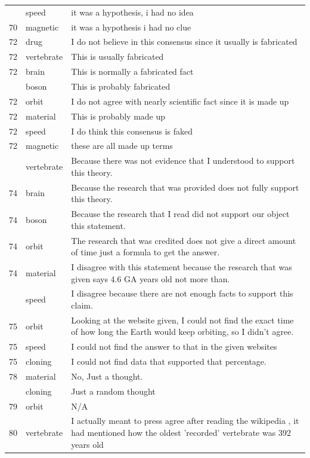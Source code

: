 \documentclass[
  doc,floatsintext]{apa6}
\begin{document}
\begin{longtable}[t]{>{}r>{}l>{\raggedright\arraybackslash}p{30em}}
\addlinespace
70 & speed & it was a hypothesis, i had no idea\\
70 & magnetic & it was a hypothesis i had no clue\\
72 & drug & I do not believe in this consensus since it usually is fabricated\\
72 & vertebrate & This is usually fabricated\\
72 & brain & This is normally a fabricated fact\\
\addlinespace
72 & boson & This is probably fabricated\\
72 & orbit & I do not agree with nearly scientific fact since it is made up\\
72 & material & This is probably made up\\
72 & speed & I do think this consensus is faked\\
72 & magnetic & these are all made up terms\\
\addlinespace
74 & vertebrate & Because there was not evidence that I understood to support this theory.\\
74 & brain & Because the research that was provided does not fully support this theory.\\
74 & boson & Because the research that I read did not support our object this statement.\\
74 & orbit & The research that was credited does not give a direct amount of time just a formula to get the answer.\\
74 & material & I disagree with this statement because the research that was given says 4.6 GA years old not more than.\\
\addlinespace
74 & speed & I disagree because there are not enough facts to support this claim.\\
75 & orbit & Looking at the website given, I could not find the exact time of how long the Earth would keep orbiting, so I didn't agree.\\
75 & speed & I could not find the answer to that in the given websites\\
75 & cloning & I could not find data that supported that percentage.\\
78 & material & No, Just a thought.\\
\addlinespace
78 & cloning & Just a random thought\\
79 & orbit & N/A\\
80 & vertebrate & I actually meant to press agree after reading the wikipedia , it had mentioned how the oldest 'recorded' vertebrate was 392 years old\\

\end{longtable}
\end{document}
